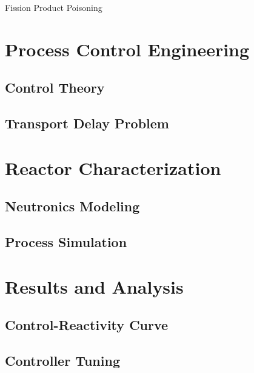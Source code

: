 \documentclass[aspectratio=169,pdftex,dvipsnames]{beamer}
\begin{document}
\begin{frame}{Fission Product Poisoning}
\end{frame}


\section{Process Control Engineering}
\subsection{Control Theory}

\subsection{Transport Delay Problem}

\section{Reactor Characterization}
\subsection{Neutronics Modeling}

\subsection{Process Simulation}


\section{Results and Analysis}
\subsection{Control-Reactivity Curve}

\subsection{Controller Tuning}
\end{document}
